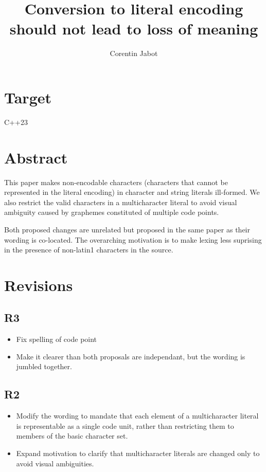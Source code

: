 \documentclass{wg21}
\title{Conversion to literal encoding should not lead to loss of meaning}
\author{Corentin Jabot}{corentin.jabot@gmail.com}
\begin{document}
    
    \maketitle
    
    
    \section{Target}
    
    C++23
    
    \section{Abstract}
    
    This paper makes non-encodable characters (characters that cannot be represented in the literal encoding) in character and string literals ill-formed. 
    We also restrict the valid characters in a multicharacter literal to avoid visual ambiguity caused by graphemes constituted of multiple code points.
    
    Both proposed changes are unrelated but proposed in the same paper as their wording is co-located.
    The overarching motivation is to make lexing less suprising in the presence of non-latin1 characters in the source.
    
    \section{Revisions}
    \subsection{R3}
    \begin{itemize}
        \item Fix spelling of code point
        \item Make it clearer than both proposals are independant, but the wording is jumbled together.
    \end{itemize}
    
    \subsection{R2}
    \begin{itemize}
        \item Modify the wording to mandate that each element of a multicharacter literal is representable as a single code unit,
        rather than restricting them to members of the basic character set. 
        \item Expand motivation to clarify that multicharacter literals are changed only to avoid visual ambiguities.
    \end{itemize}
    
\end{document}
